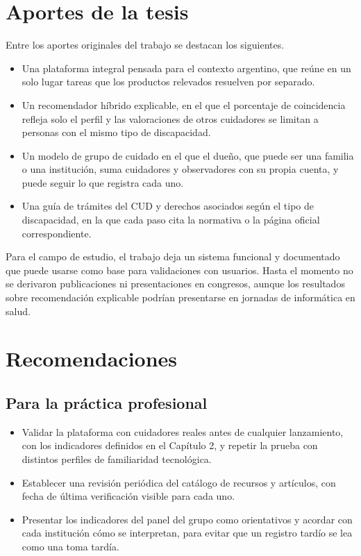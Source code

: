 \section{Aportes de la tesis}

Entre los aportes originales del trabajo se destacan los siguientes.

\begin{itemize}
    \item Una plataforma integral pensada para el contexto argentino, que reúne en un solo lugar tareas que los productos relevados resuelven por separado.
    \item Un recomendador híbrido explicable, en el que el porcentaje de coincidencia refleja solo el perfil y las valoraciones de otros cuidadores se limitan a personas con el mismo tipo de discapacidad.
    \item Un modelo de grupo de cuidado en el que el dueño, que puede ser una familia o una institución, suma cuidadores y observadores con su propia cuenta, y puede seguir lo que registra cada uno.
    \item Una guía de trámites del CUD y derechos asociados según el tipo de discapacidad, en la que cada paso cita la normativa o la página oficial correspondiente.
\end{itemize}

Para el campo de estudio, el trabajo deja un sistema funcional y documentado que puede usarse como base para validaciones con usuarios. Hasta el momento no se derivaron publicaciones ni presentaciones en congresos, aunque los resultados sobre recomendación explicable podrían presentarse en jornadas de informática en salud.

\section{Recomendaciones}

\subsection{Para la práctica profesional}

\begin{itemize}
    \item Validar la plataforma con cuidadores reales antes de cualquier lanzamiento, con los indicadores definidos en el Capítulo 2, y repetir la prueba con distintos perfiles de familiaridad tecnológica.
    \item Establecer una revisión periódica del catálogo de recursos y artículos, con fecha de última verificación visible para cada uno.
    \item Presentar los indicadores del panel del grupo como orientativos y acordar con cada institución cómo se interpretan, para evitar que un registro tardío se lea como una toma tardía.
\end{itemize}

